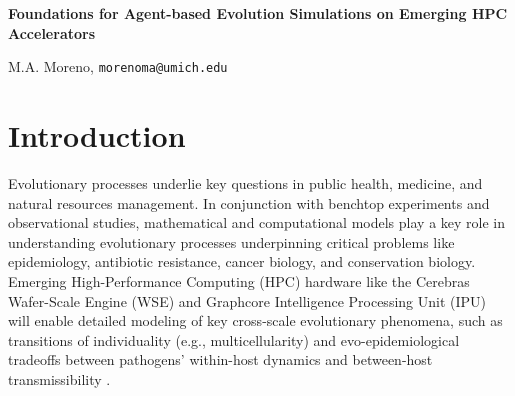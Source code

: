 

\begin{center}
\textbf{Foundations for Agent-based Evolution Simulations on Emerging HPC Accelerators}

M.A. Moreno, \texttt{morenoma@umich.edu}
\end{center}
\vspace{-2ex}
\section{Introduction}
Evolutionary processes underlie key questions in public health, medicine, and natural resources management.
In conjunction with benchtop experiments and observational studies, mathematical and computational models play a key role in understanding evolutionary processes underpinning critical problems like epidemiology, antibiotic resistance, cancer biology, and conservation biology.
Emerging High-Performance Computing (HPC) hardware like the Cerebras Wafer-Scale Engine (WSE) and Graphcore Intelligence Processing Unit (IPU) will enable detailed modeling of key cross-scale evolutionary phenomena, such as transitions of individuality (e.g., multicellularity) and evo-epidemiological tradeoffs between pathogens' within-host dynamics and between-host transmissibility \cite{goldsby2020major,schreiber2021evolutionary}.

